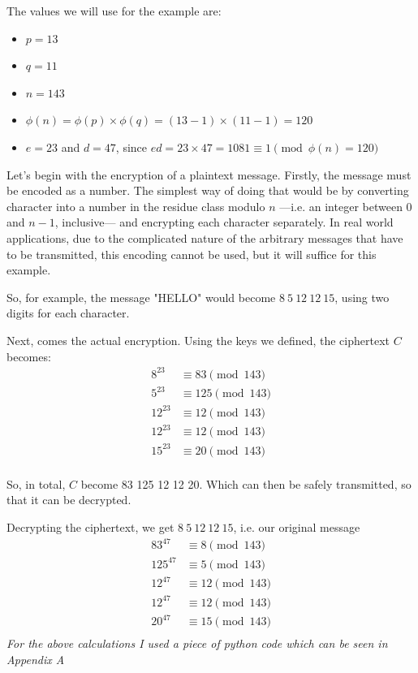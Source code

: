 \documentclass[12pt, titlepage]{article}
\begin{document}
The values we will use for the example are: 
\begin{itemize}
    \item $p=13$ 
    \item $q=11$
    \item $n=143$ 
    \item $\phi (n) = \phi(p) \times \phi(q) = (13-1) \times (11-1) = 120$ 
    \item $e = 23$ and $d = 47$, since $ed = 23 \times 47 = 1081 \equiv 1 \pmod{\phi(n)=120}$
\end{itemize}

Let's begin with the encryption of a plaintext message. Firstly, the message must be encoded
as a number. The simplest way of doing that would be by converting character into a number
in the residue class modulo $n$ ---i.e. an integer between $0$ and $n-1$, inclusive--- and
encrypting each character separately.  In real world applications, due to the complicated
nature of the arbitrary messages that have to be transmitted, this encoding cannot be used,
but it will suffice for this example.

So, for example, the message "HELLO" would become $8\ 5\ 12\ 12\ 15$, using two digits for
each character.

Next, comes the actual encryption. Using the keys we defined, the ciphertext $C$ becomes: 
\begin{align*}
    8^{23}  &\equiv 83 \pmod{143} \\
    5^{23}  &\equiv 125 \pmod{143} \\
    12^{23}  &\equiv 12 \pmod{143} \\
    12^{23}  &\equiv 12 \pmod{143} \\
    15^{23}  &\equiv 20 \pmod{143} \\
\end{align*}

So, in total, $C$ become 83 125 12 12 20. Which can then be safely transmitted, so that it can be decrypted.   

Decrypting the ciphertext, we get $8\ 5\ 12\ 12\ 15$, i.e. our original message
\begin{align*}
    83^{47}  &\equiv 8 \pmod{143} \\
    125^{47}  &\equiv 5 \pmod{143} \\
    12^{47}  &\equiv 12 \pmod{143} \\
    12^{47}  &\equiv 12 \pmod{143} \\
    20^{47}  &\equiv 15 \pmod{143} \\
\end{align*}
\textit{For the above calculations I used a piece of python code which can be seen in
Appendix A}
\end{document}
